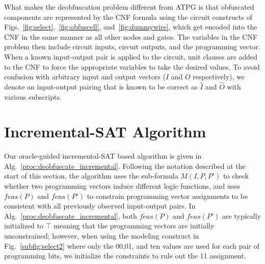 \documentclass[proposal]{umassthesis}  %
\begin{document}
What makes the deobfuscation problem different from ATPG is that obfuscated components are represented by the CNF formula using the circuit constructs of Figs.~\ref{fig:select},~\ref{fig:obfuscell}, and~\ref{fig:dummywire}, which get encoded into the CNF in the same manner as all other nodes and gates. The variables in the CNF problem then include circuit inputs, circuit outputs, and the programming vector. When a known input-output pair is applied to the circuit, unit clauses are added to the CNF to force the appropriate variables to take the desired values. To avoid confusion {with arbitrary input and output vectors ($I$ and $O$ respectively)}, we denote an input-output pairing that is known to be correct as $\widehat{I}$ and $\widehat{O}$ with various subscripts. 
















\section{Incremental-SAT Algorithm}

Our oracle-guided incremental-SAT based algorithm is given in Alg.~\ref{proc:deobfuscate_incremental}. Following the notation described at the start of this section, the algorithm uses the sub-formula $M(I,P,P')$ to check whether two programming vectors induce different logic functions, and uses $feas(P)$ and $feas(P')$ to constrain programming vector assignments to be consistent with all previously observed input-output pairs. {In Alg.~\ref{proc:deobfuscate_incremental}, both $feas(P)$ and $feas(P')$ are typically initialized to $\top$ meaning that the programming vectors are initially unconstrained; however, when using the modeling construct in Fig.~\ref{subfig:select2} where only the 00,01, and ten values are used for each pair of programming bits, we initialize the constraints to rule out the 11 assignment.}
\end{document}
